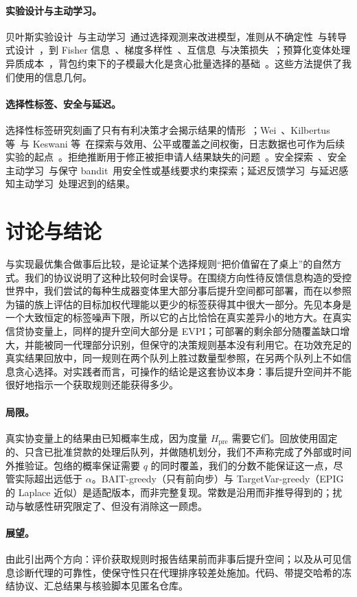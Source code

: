 \documentclass[runningheads]{llncs}
\begin{document}
\paragraph{实验设计与主动学习。}贝叶斯实验设计~\cite{chaloner1995bayesian}与主动学习~\cite{cohn1996active,settles2009active}通过选择观测来改进模型，准则从不确定性~\cite{lewis1994sequential}与转导式设计~\cite{yu2006transductive}，到 Fisher 信息~\cite{ash2021fishing}、梯度多样性~\cite{ash2020badge}、互信息~\cite{kirsch2019batchbald,bickfordsmith2023prediction}与决策损失~\cite{huang2026loss}；预算化变体处理异质成本~\cite{tomanek2010cost,morato2025conbatch}，背包约束下的子模最大化是贪心批量选择的基础~\cite{sviridenko2004note}。这些方法提供了我们使用的信息几何。

\paragraph{选择性标签、安全与延迟。}选择性标签研究刻画了只有有利决策才会揭示结果的情形~\cite{lakkaraju2017selective}；Wei~\cite{wei2021selective}、Kilbertus 等~\cite{kilbertus2020fair}与 Keswani 等~\cite{keswani2024partial}在探索与效用、公平或覆盖之间权衡，日志数据也可作为后续实验的起点~\cite{yan2018logged}。拒绝推断用于修正被拒申请人结果缺失的问题~\cite{crook2004reject}。安全探索~\cite{sui2015safe}、安全主动学习~\cite{schreiter2015safe}与保守 bandit~\cite{wu2016conservative}用安全性或基线要求约束探索；延迟反馈学习~\cite{joulani2013delayed,chapelle2014delayed}与延迟感知主动学习~\cite{pham2022latency}处理迟到的结果。

\section{讨论与结论}
\label{sec:conclusion}
与实现最优集合做事后比较，是论证某个选择规则“把价值留在了桌上”的自然方式。我们的协议说明了这种比较何时会误导。在围绕方向性待反馈信息构造的受控世界中，我们尝试的每种生成器变体里大部分事后提升空间都可部署，而在以参照为锚的族上评估的目标加权代理能以更少的标签获得其中很大一部分。先见本身是一个大致恒定的标签噪声下限，所以它的占比恰恰在真实差异小的地方大。在真实信贷协变量上，同样的提升空间大部分是 EVPI；可部署的剩余部分随覆盖缺口增大，并能被同一代理部分识别，但保守的决策规则基本没有利用它。在功效充足的真实结果回放中，同一规则在两个队列上胜过数量型参照，在另两个队列上不如信息贪心选择。对实践者而言，可操作的结论是这套协议本身：事后提升空间并不能很好地指示一个获取规则还能获得多少。

\paragraph{局限。}真实协变量上的结果由已知概率生成，因为度量 $H_{\mathrm{pre}}$ 需要它们。回放使用固定的、只含已批准贷款的处理后队列，并做随机划分，我们不声称完成了外部或时间外推验证。包络的概率保证需要 $q$ 的同时覆盖，我们的分数不能保证这一点，尽管实际超出远低于 $\alpha$。BAIT-greedy（只有前向步）与 TargetVar-greedy（EPIG 的 Laplace 近似）是适配版本，而非完整复现。常数是沿用而非推导得到的；扰动与敏感性研究限定了、但没有消除这一顾虑。

\paragraph{展望。}由此引出两个方向：评价获取规则时报告结果前而非事后提升空间；以及从可见信息诊断代理的可靠性，使保守性只在代理排序较差处施加。代码、带提交哈希的冻结协议、汇总结果与核验脚本见匿名仓库。



\end{document}
